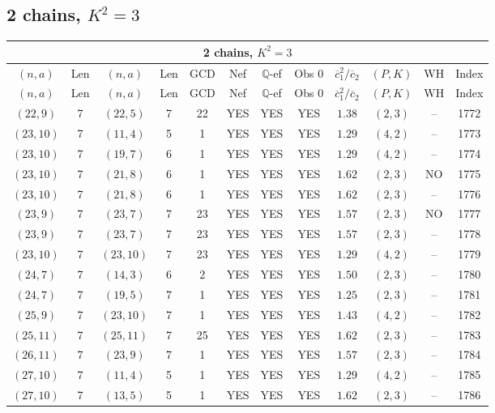 \subsection{2 chains, $K^2 = 3$}
\begin{longtable}{|c|c|c|c|c|c|c|c|c|c|c|c|}
\hline
\multicolumn{12}{|c|}{2 chains, $K^2 = 3$}\\
\hline
$(n,a)$ & Len & $(n,a)$ & Len & GCD & Nef & $\mathbb Q$-ef & Obs 0 & $\overline c_1^2 / \overline c_2$ & $(P,K)$ & WH & Index\\
\hline
\endfirsthead

\hline
$(n,a)$ & Len & $(n,a)$ & Len & GCD & Nef & $\mathbb Q$-ef & Obs 0 & $\overline c_1^2 / \overline c_2$ & $(P,K)$ & WH & Index\\
\hline
\endhead
\hline
\endfoot

$(22,9)$ & 7 & $(22,5)$ & 7 & 22 & YES & YES & YES & $1.38$ & $(2,3)$ & -- & 1772\\
$(23,10)$ & 7 & $(11,4)$ & 5 & 1 & YES & YES & YES & $1.29$ & $(4,2)$ & -- & 1773\\
$(23,10)$ & 7 & $(19,7)$ & 6 & 1 & YES & YES & YES & $1.29$ & $(4,2)$ & -- & 1774\\
$(23,10)$ & 7 & $(21,8)$ & 6 & 1 & YES & YES & YES & $1.62$ & $(2,3)$ & NO & 1775\\
$(23,10)$ & 7 & $(21,8)$ & 6 & 1 & YES & YES & YES & $1.62$ & $(2,3)$ & -- & 1776\\
$(23,9)$ & 7 & $(23,7)$ & 7 & 23 & YES & YES & YES & $1.57$ & $(2,3)$ & NO & 1777\\
$(23,9)$ & 7 & $(23,7)$ & 7 & 23 & YES & YES & YES & $1.57$ & $(2,3)$ & -- & 1778\\
$(23,10)$ & 7 & $(23,10)$ & 7 & 23 & YES & YES & YES & $1.29$ & $(4,2)$ & -- & 1779\\
$(24,7)$ & 7 & $(14,3)$ & 6 & 2 & YES & YES & YES & $1.50$ & $(2,3)$ & -- & 1780\\
$(24,7)$ & 7 & $(19,5)$ & 7 & 1 & YES & YES & YES & $1.25$ & $(2,3)$ & -- & 1781\\
$(25,9)$ & 7 & $(23,10)$ & 7 & 1 & YES & YES & YES & $1.43$ & $(4,2)$ & -- & 1782\\
$(25,11)$ & 7 & $(25,11)$ & 7 & 25 & YES & YES & YES & $1.62$ & $(2,3)$ & -- & 1783\\
$(26,11)$ & 7 & $(23,9)$ & 7 & 1 & YES & YES & YES & $1.57$ & $(2,3)$ & -- & 1784\\
$(27,10)$ & 7 & $(11,4)$ & 5 & 1 & YES & YES & YES & $1.29$ & $(4,2)$ & -- & 1785\\
$(27,10)$ & 7 & $(13,5)$ & 5 & 1 & YES & YES & YES & $1.62$ & $(2,3)$ & -- & 1786\\

\end{longtable}
